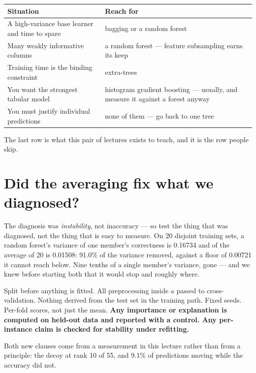 \documentclass[11pt,a4paper]{article}
\begin{document}
\begin{center}
\small
\begin{tabular}{p{}p{}}
\toprule
\textbf{Situation} & \textbf{Reach for} \\
\midrule
A high-variance base learner and time to spare & bagging or a random forest \\
Many weakly informative columns & a random forest --- feature subsampling earns
                                  its keep \\
Training time is the binding constraint & extra-trees \\
You want the strongest tabular model & histogram gradient boosting --- usually,
                                       and measure it against a forest anyway \\
You must justify individual predictions & none of them --- go back to one
                                          tree \\
\bottomrule
\end{tabular}
\end{center}

The last row is what this pair of lectures exists to teach, and it is the row
people skip.

\section{Did the averaging fix what we diagnosed?}

The diagnosis was \emph{instability}, not inaccuracy --- so test the thing that
was diagnosed, not the thing that is easy to measure. On 20 disjoint training
sets, a random forest's variance of one member's correctness is 0.16734 and of
the average of 20 is 0.01508: 91.0\% of the variance removed, against a floor
of 0.00721 it cannot reach below. Nine tenths of a single member's variance,
gone --- and we knew before starting both that it would stop and roughly where.

\begin{keybox}[title={The standing constraint, extended by two clauses}]
Split before anything is fitted. All preprocessing inside a 
passed to cross-validation. Nothing derived from the test set in the training
path. Fixed seeds. Per-fold scores, not just the mean. \textbf{Any importance
or explanation is computed on held-out data and reported with a control. Any
per-instance claim is checked for stability under refitting.}

Both new clauses come from a measurement in this lecture rather than from a
principle: the decoy at rank 10 of 55, and 9.1\% of predictions moving while
the accuracy did not.
\end{keybox}
\end{document}
